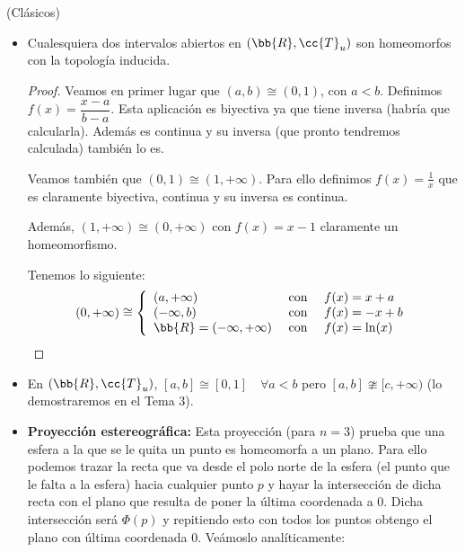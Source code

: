 \begin{ejemplo}(Clásicos)
    \begin{itemize}
        \item Cualesquiera dos intervalos abiertos en $(\bb{R}, \cc{T}_u)$ son homeomorfos con la topología inducida.
        \begin{proof}
            Veamos en primer lugar que $(a,b) \cong (0,1)$, con $a<b$. Definimos $f(x)=\dfrac{x-a}{b-a}$. Esta aplicación es biyectiva ya que tiene inversa (habría que calcularla). Además es continua y su inversa (que pronto tendremos calculada) también lo es.

            Veamos también que $(0,1)\cong (1, +\infty)$. Para ello definimos $f(x)=\frac{1}{x}$ que es claramente biyectiva, continua y su inversa es continua.

            Además, $(1, +\infty)\cong (0,+\infty)$ con $f(x)=x-1$ claramente un homeomorfismo.

            Tenemos lo siguiente:
            \begin{gather*}
                (0,+\infty)\cong \left\{
                \begin{array}{lcl}
                    (a, +\infty) & \text{ con } & f(x)=x+a\\
                    (-\infty, b) & \text{ con } & f(x) = -x +b\\
                    \bb{R}=(-\infty, +\infty) & \text{ con } & f(x)=\ln(x)\\
                \end{array}
                \right.
            \end{gather*}
        \end{proof}

        \item En $(\bb{R}, \cc{T}_u)$, $[a,b]\cong [0,1]$\ \ $\forall a<b$ pero $[a,b]\ncong [c, +\infty)$ (lo demostraremos en el Tema 3).
        
        \item \textbf{Proyección estereográfica:} Esta proyección (para $n=3$) prueba que una esfera a la que se le quita un punto es homeomorfa a un plano. Para ello podemos trazar la recta que va desde el polo norte de la esfera (el punto que le falta a la esfera) hacia cualquier punto $p$ y hayar la intersección de dicha recta con el plano que resulta de poner la última coordenada a 0. Dicha intersección será $\Phi(p)$ y repitiendo esto con todos los puntos obtengo el plano con última coordenada 0. Veámoslo analíticamente:
        

\end{itemize}
\end{ejemplo}
